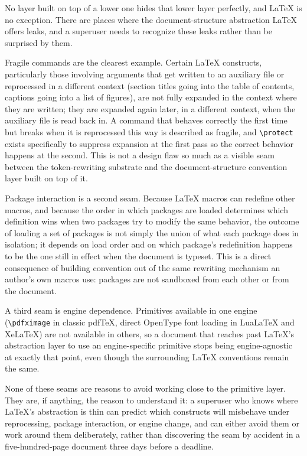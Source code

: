 No layer built on top of a lower one hides that lower layer perfectly, and LaTeX is no exception. There are places where the document-structure abstraction LaTeX offers leaks, and a superuser needs to recognize these leaks rather than be surprised by them.

Fragile commands are the clearest example. Certain LaTeX constructs, particularly those involving arguments that get written to an auxiliary file or reprocessed in a different context (section titles going into the table of contents, captions going into a list of figures), are not fully expanded in the context where they are written; they are expanded again later, in a different context, when the auxiliary file is read back in. A command that behaves correctly the first time but breaks when it is reprocessed this way is described as fragile, and \texttt{\textbackslash{}protect} exists specifically to suppress expansion at the first pass so the correct behavior happens at the second. This is not a design flaw so much as a visible seam between the token-rewriting substrate and the document-structure convention layer built on top of it.

Package interaction is a second seam. Because LaTeX macros can redefine other macros, and because the order in which packages are loaded determines which definition wins when two packages try to modify the same behavior, the outcome of loading a set of packages is not simply the union of what each package does in isolation; it depends on load order and on which package's redefinition happens to be the one still in effect when the document is typeset. This is a direct consequence of building convention out of the same rewriting mechanism an author's own macros use: packages are not sandboxed from each other or from the document.

A third seam is engine dependence. Primitives available in one engine (\texttt{\textbackslash{}pdfximage} in classic pdfTeX, direct OpenType font loading in LuaLaTeX and XeLaTeX) are not available in others, so a document that reaches past LaTeX's abstraction layer to use an engine-specific primitive stops being engine-agnostic at exactly that point, even though the surrounding LaTeX conventions remain the same.

None of these seams are reasons to avoid working close to the primitive layer. They are, if anything, the reason to understand it: a superuser who knows where LaTeX's abstraction is thin can predict which constructs will misbehave under reprocessing, package interaction, or engine change, and can either avoid them or work around them deliberately, rather than discovering the seam by accident in a five-hundred-page document three days before a deadline.
